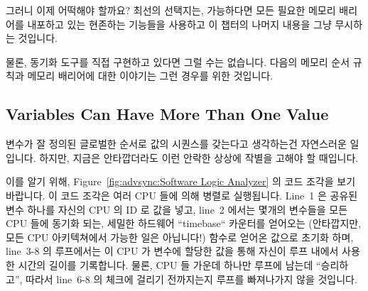 그러니 이제 어떡해야 할까요?
최선의 선택지는, 가능하다면 모든 필요한 메모리 배리어를 내포하고 있는 현존하는
기능들을 사용하고 이 챕터의 나머지 내용을 그냥 무시하는 것입니다.

물론, 동기화 도구를 직접 구현하고 있다면 그럴 수는 없습니다.
다음의 메모리 순서 규칙과 메모리 배리어에 대한 이야기는 그런 경우를 위한
것입니다.

\subsection{Variables Can Have More Than One Value}
\label{sec:advsync:Variables Can Have More Than One Value}

변수가 잘 정의된 글로벌한 순서로 값의 시퀀스를 갖는다고 생각하는건 자연스러운
일입니다.
하지만, 지금은 안타깝더라도 이런 안락한 상상에 작별을 고해야 할 때입니다.

이를 알기 위해, Figure~\ref{fig:advsync:Software Logic Analyzer} 의 코드 조각을
보기 바랍니다.
이 코드 조각은 여러 CPU 들에 의해 병렬로 실행됩니다.
Line~1 은 공유된 변수 하나를 자신의 CPU 의 ID 로 값을 넣고, line~2 에서는
몇개의 변수들을 모든 CPU 들에 동기화 되는, 세밀한 하드웨어 ``timebase``
카운터를 얻어오는 (안타깝지만, 모든 CPU 아키텍쳐에서 가능한 일은 아닙니다!)
 함수로 얻어온 값으로 초기화 하며, line~3-8 의 루프에서는 이 CPU 가
변수에 할당한 값을 통해 자신이 루프 내에서 사용한 시간의 길이를 기록합니다.
물론, CPU 들 가운데 하나만 루프에 남는데 ``승리하고'', 따라서 line~6-8 의
체크에 걸리기 전까지는지 루프를 빠져나가지 않을 것입니다.


